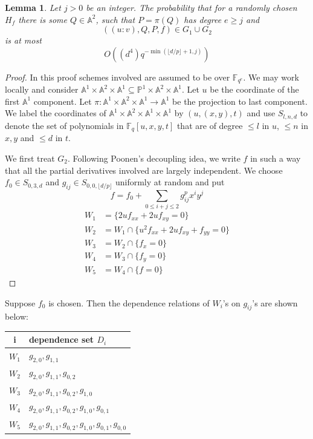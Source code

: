 \documentclass[12pt]{article}
\theoremstyle{plain}
\newtheorem{lemma}[equation]{Lemma}
\theoremstyle{definition}
\newcommand{\IA}{\mathbb{A}}
\newcommand{\IF}{\mathbb{F}}
\newcommand{\IP}{\mathbb{P}}
\newcommand{\Spec}{\rm Spec\,}
\newcommand{\<}{\langle}
\renewcommand{\>}{\rangle}
\newcommand{\fl}[1]{\lfloor #1 \rfloor}
\begin{document}
\begin{lemma}
\label{projection}
Let $j > 0$ be an integer. The probability that for a randomly chosen $H_f$ there is some $Q \in \IA^2$, such that $P = \pi(Q)$ has degree $e \ge j$ and  
$$ ((u : v), Q, P, f) \in G_1 \cup G_2 $$
is at most 
$$ O((d^4) q^{-\min(\fl{d/p} + 1, j)})$$
\end{lemma}
\begin{proof}
In this proof schemes involved are assumed to be over $\IF_{q^e}$. We may work locally and consider $\IA^1 \times \IA^2 \times \IA^1 \subseteq \IP^1 \times \IA^2 \times \IA^1$. Let $u$ be the coordinate of the first $\IA^1$ component. Let $\pi : \IA^1 \times \IA^2 \times \IA^1 \to \IA^1$ be the projection to last component. We label the coordinates of $\IA^1 \times \IA^2 \times \IA^1 \times \IA^1$ by $(u, (x, y), t)$ and use $S_{l, n, d}$ to denote the set of polynomials in $\IF_q[u, x, y, t]$ that are of degree $\le l$ in $u$, $\le n$ in $x, y$ and $\le d$ in $t$. 

We first treat $G_2$. Following Poonen's decoupling idea, we write $f$ in such a way that all the partial derivatives involved are largely independent. We choose $f_0 \in S_{0, 3, d}$ and $g_{ij} \in S_{0, 0, \fl{d/p}}$ uniformly at random and put 
$$ f = f_0 + \sum_{0 \le i + j \le 2} g_{ij}^p x^i y^j$$
\begin{align*}
W_1 &= \{ 2u f_{xx} + 2u f_{xy} = 0 \}\\
W_2 &= W_1 \cap \{u^2 f_{xx} + 2u f_{xy} + f_{yy} = 0\}\\
W_3 &= W_2 \cap \{ f_x = 0 \} \\
W_4 &= W_3 \cap \{ f_y = 0 \} \\
W_5 &= W_4 \cap \{ f = 0 \}
\end{align*}
\end{proof}
Suppose $f_0$ is chosen. Then the dependence relations of $W_i$'s on $g_{ij}$'s are shown below:
\begin{center}
\begin{tabular}{|c | l |}
\hline
i & dependence set $D_i$ \\ \hline
$W_1$ & $g_{2, 0}, g_{1, 1}$ \\ \hline
$W_2$ & $g_{2, 0}, g_{1, 1}, g_{0, 2}$ \\ \hline
$W_3$ & $g_{2, 0}, g_{1, 1}, g_{0, 2}, g_{1, 0}$ \\ \hline
$W_4$ & $g_{2, 0}, g_{1, 1}, g_{0, 2}, g_{1, 0}, g_{0, 1}$ \\ \hline
$W_5$ & $g_{2, 0}, g_{1, 1}, g_{0, 2}, g_{1, 0}, g_{0, 1}, g_{0, 0}$ \\ \hline
\end{tabular}
\end{center}
\end{document}
